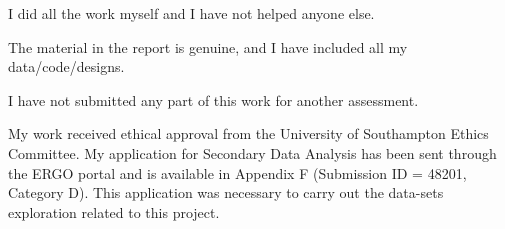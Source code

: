 \begin{StatementofOriginality}
\vskip20pt

\begin{tcolorbox}
I did all the work myself and I have not helped anyone else.
\end{tcolorbox}

\vskip20pt

\begin{tcolorbox}
The material in the report is genuine, and I have included all my data/code/designs.
\end{tcolorbox}

\vskip20pt


\begin{tcolorbox}
I have not submitted any part of this work for another assessment.
\end{tcolorbox}

\begin{tcolorbox}
My work received ethical approval from the University of Southampton Ethics Committee. My application for Secondary Data Analysis has been sent through the ERGO  portal and is available in Appendix F (Submission ID = 48201, Category D). This application was necessary to carry out the data-sets exploration related to this project.
\end{tcolorbox}

\end{StatementofOriginality}
